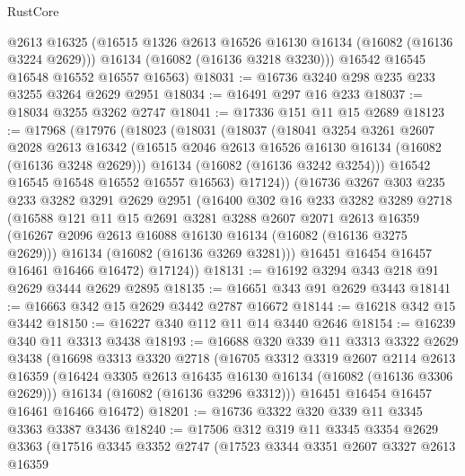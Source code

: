 \begin{lexlean}{RustCore}
\begin{coremodule}
        @2613
        @16325
        (@16515 @1326 @2613 @16526 @16130 @16134 (@16082 (@16136 @3224 @2629)))
        @16134
        (@16082 (@16136 @3218 @3230)))
      @16542
      @16545
      @16548
      @16552
      @16557
      @16563)
@18031 := @16736 @3240 @298 @235 @233 @3255 @3264 @2629 @2951
@18034 := @16491 @297 @16 @233
@18037 := @18034 @3255 @3262 @2747
@18041 := @17336 @151 @11 @15 @2689
@18123 := @17968
    (@17976
      (@18023
        (@18031
          (@18037
            (@18041
              @3254
              @3261
              @2607
              @2028
              @2613
              @16342
              (@16515 @2046 @2613 @16526 @16130 @16134 (@16082 (@16136 @3248 @2629)))
              @16134
              (@16082 (@16136 @3242 @3254)))
            @16542
            @16545
            @16548
            @16552
            @16557
            @16563)
          @17124))
      (@16736
        @3267
        @303
        @235
        @233
        @3282
        @3291
        @2629
        @2951
        (@16400
          @302
          @16
          @233
          @3282
          @3289
          @2718
          (@16588
            @121
            @11
            @15
            @2691
            @3281
            @3288
            @2607
            @2071
            @2613
            @16359
            (@16267 @2096 @2613 @16088 @16130 @16134 (@16082 (@16136 @3275 @2629)))
            @16134
            (@16082 (@16136 @3269 @3281)))
          @16451
          @16454
          @16457
          @16461
          @16466
          @16472)
        @17124))
@18131 := @16192 @3294 @343 @218 @91 @2629 @3444 @2629 @2895
@18135 := @16651 @343 @91 @2629 @3443
@18141 := @16663 @342 @15 @2629 @3442 @2787 @16672
@18144 := @16218 @342 @15 @3442
@18150 := @16227 @340 @112 @11 @14 @3440 @2646
@18154 := @16239 @340 @11 @3313 @3438
@18193 := @16688
    @320
    @339
    @11
    @3313
    @3322
    @2629
    @3438
    (@16698
      @3313
      @3320
      @2718
      (@16705
        @3312
        @3319
        @2607
        @2114
        @2613
        @16359
        (@16424 @3305 @2613 @16435 @16130 @16134 (@16082 (@16136 @3306 @2629)))
        @16134
        (@16082 (@16136 @3296 @3312)))
      @16451
      @16454
      @16457
      @16461
      @16466
      @16472)
@18201 := @16736 @3322 @320 @339 @11 @3345 @3363 @3387 @3436
@18240 := @17506
    @312
    @319
    @11
    @3345
    @3354
    @2629
    @3363
    (@17516
      @3345
      @3352
      @2747
      (@17523
        @3344
        @3351
        @2607
        @3327
        @2613
        @16359

\end{coremodule}
\end{lexlean}
